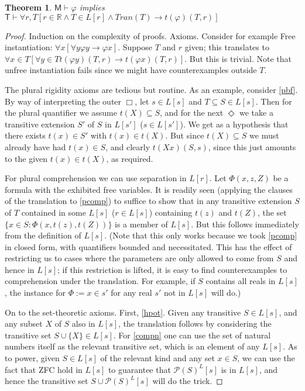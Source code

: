 \documentclass{article}
\newtheorem{Theorem}{Theorem}[section]
\theoremstyle{definition}
\begin{document}
\begin{Theorem}
  $\mathsf{M} \vdash \varphi$ implies $\mathsf{T} \vdash \forall r, T [r \in \mathbb{R} \wedge T \in L[r] \wedge Tran(T) \rightarrow t(\varphi)(T, r)]$  
\end{Theorem}
\begin{proof}
    Induction on the complexity of proofs. Axioms. Consider for example 
    Free instantiation: $\forall x[\forall y \varphi y \rightarrow \varphi x]$.
    Suppose $T$ and $r$ given; this translates to $\forall x \in T [ \forall y \in T t(\varphi y)(T, r) \rightarrow t(\varphi x) (T, r)]$.
    But this is trivial. Note that unfree instantiation fails since we might have counterexamples 
    outside $T$.

    The plural rigidity axioms are tedious but routine. As an example, consider \eqref{pbf}.
    By way of interpreting the outer $\Box$, let $s \in L[s]$ and $T\subseteq S \in L[s]$. 
    Then for the plural quantifier we assume $t(X) \subseteq S$, and for the next $\Diamond$ 
    we take a transitive extension $S'$ of $S$ in $L[s']$ ($s \in L[s']$). 
    We get as a hypothesis that there exists $t(x) \in S'$ with $t(x) \in t(X)$. 
    But since $t(X) \subseteq S$ we must already have had $t(x) \in S$, 
    and clearly $t(Xx)(S, s)$, since this just amounts 
    to the given $t(x) \in t(X)$, as required.

    For plural comprehension 
    we can use separation in $L[r]$. Let $\Phi(x, z, Z)$ be a formula with the exhibited 
    free variables. It is readily seen 
    (applying the clauses of the translation to \eqref{pcomp}) 
    to suffice to show that 
    in any transitive extension $S$ of $T$ contained in some $L[s]$ ($r \in L[s]$) 
    containing $t(z)$ and $t(Z)$, the set $\{x \in S : \Phi(x, t(z), t(Z))\}$ is a member of $L[s]$. 
    But this follows immediately from the definition of $L[s]$.
    (Note that this only works because we took \eqref{pcomp} in closed form, with quantifiers 
    bounded and necessitated. This has the effect of restricting us to cases where the parameters
    are only allowed to come from $S$ and hence in $L[s]$; if this restriction is lifted, it is 
    easy to find counterexamples to comprehension under the translation. For example, if $S$ contains 
    all reals in $L[s]$, the instance for $\Phi := x \in s'$ for any real $s'$ not in $L[s]$ will do.) 

    On to the set-theoretic axioms. First, \eqref{hpot}. Given any transitive $S \in L[s]$, and any 
    subset $X$ of $S$ also in $L[s]$, the translation follows by considering the transitive set 
    $S \cup \{X\} \in L[s]$. For \eqref{compn} one can use the set of natural numbers itself as the 
    relevant transitive set, which is an element of any $L[s]$. 
    As to power, given $S \in L[s]$ of the relevant kind and any set $x \in S$, we can use the 
    fact that ZFC hold in $L[s]$ to guarantee that $\mathcal{P}(S)^L[s]$ is in $L[s]$, and hence 
    the transitive set $S \cup \mathcal{P}(S)^L[s]$ will do the trick.


\end{proof}
\end{document}
